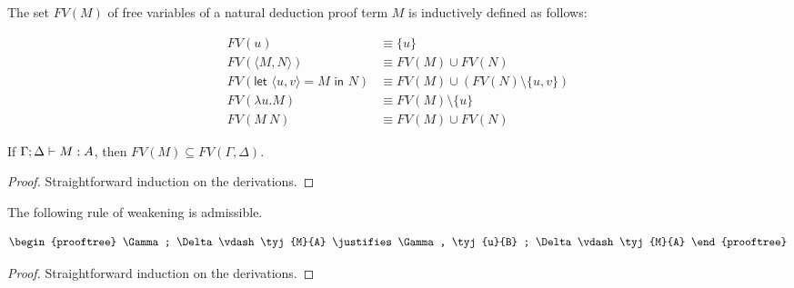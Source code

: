 \documentclass{docs}
\begin{document}
\begin{definition}
  The set $FV(M)$ of free variables of a natural deduction proof term $M$ is
  inductively defined as follows:

  \begin{align*}
    FV(u) & \equiv \{ u \} \\
    FV(\langle M, N \rangle) & \equiv FV(M) \cup FV(N) \\
    FV(\textsf{let }\langle u,v \rangle = M \textsf{ in } N) & \equiv FV(M) \cup (FV(N) \setminus \{ u, v \}) \\
    FV(\lambda u . M) & \equiv FV(M) \setminus \{ u \} \\
    FV(M\ N) & \equiv FV(M) \cup FV(N)
  \end{align*}
\end{definition}

\begin{lemma}
  If $\Gamma ; \Delta \vdash M : A$, then
  $FV(M) \subseteq FV(\Gamma, \Delta)$.
\end{lemma}
\begin{proof}
  Straightforward induction on the derivations.
\end{proof}

\begin{lemma}
  The following rule of weakening is admissible.

  \[
    \begin{prooftree}
      \Gamma ; \Delta \vdash \tyj{M}{A}
      \justifies
      \Gamma, \tyj{u}{B} ; \Delta \vdash \tyj{M}{A}
    \end{prooftree}
  \]
\end{lemma}
\begin{proof}
  Straightforward induction on the derivations.
\end{proof}
\end{document}

